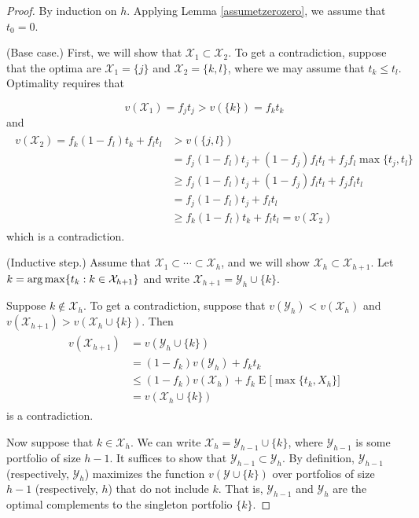 \begin{proof}
By induction on $h$. Applying Lemma \ref{assumetzerozero}, we assume that $t_0 = 0$. 

(Base case.) First, we will show that $\mathcal{X}_1 \subset \mathcal{X}_2$. To get a contradiction, suppose that the optima are $\mathcal{X}_1 = \{j\}$ and $\mathcal{X}_2 = \{k, l\}$, where we may assume that $t_k \leq t_l$. Optimality requires that

\begin{equation*}
v(\mathcal{X}_1 )  = f_j t_j > v(\{k\}) = f_k t_k
\end{equation*}
and
\begin{align*}
\begin{split}
v(\mathcal{X}_2) =  f_k (1- f_l) t_k + f_l t_l &> v(\{j, l\}) \\
& = f_j (1- f_l) t_j + (1- f_j) f_l t_l + f_j f_l \max\{t_j, t_l\} \\
&\geq  f_j (1- f_l) t_j + (1- f_j) f_l t_l + f_j f_l  t_l \\
&= f_j (1- f_l) t_j + f_l t_l  \\
&\geq f_k (1- f_l) t_k + f_l t_l  = v(\mathcal{X}_2)
\end{split}
\end{align*}
which is a contradiction. 

(Inductive step.) Assume that $\mathcal{X}_1 \subset \cdots \subset \mathcal{X}_h$, and we will show $\mathcal{X}_h \subset \mathcal{X}_{h+1}$. Let $k = \operatorname*{arg\,max}\{ t_k: k \in \mathcal{X}_{h+1}\}$ and write $\mathcal{X}_{h+1} = \mathcal{Y}_{h} \cup \{k\}$.

Suppose $k \notin \mathcal{X}_h$. To get a contradiction, suppose that $v(\mathcal{Y}_h) < v(\mathcal{X}_h)$ and  $v(\mathcal{X}_{h+1}) > v(\mathcal{X}_h \cup \{k\})$. Then
\begin{align*}
\begin{split}
v(\mathcal{X}_{h+1})&= v(\mathcal{Y}_{h} \cup \{k\}) \\
&= (1 - f_k) v(\mathcal{Y}_h) + f_k t_k \\
&\leq (1 - f_k) v(\mathcal{X}_h) + f_k \operatorname{E}\bigl[ \max\{t_k, X_h\}\bigr]\\
&=  v(\mathcal{X}_h\cup \{k\})
\end{split}
\end{align*}
is a contradiction.

Now suppose that $k \in \mathcal{X}_h$. We can write $\mathcal{X}_h = \mathcal{Y}_{h-1} \cup \{k\}$, where $ \mathcal{Y}_{h-1}$ is some portfolio of size $h-1$. It suffices to show that $ \mathcal{Y}_{h-1} \subset \mathcal{Y}_h$. By definition, $\mathcal{Y}_{h-1}$ (respectively, $\mathcal{Y}_{h}$) maximizes the function $v(\mathcal{Y}\cup\{k\})$ over portfolios of size $h-1$ (respectively, $h$) that do not include $k$. That is, $\mathcal{Y}_{h-1}$ and $\mathcal{Y}_h$ are the optimal complements to the singleton portfolio $\{k\}$.


\end{proof}
